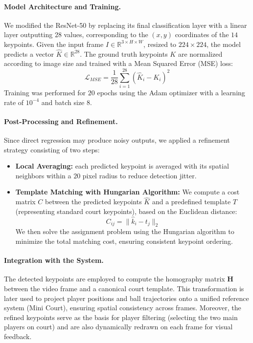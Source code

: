 \paragraph{Model Architecture and Training.}  
We modified the ResNet-50 by replacing its final classification layer with a linear layer outputting $28$ values, corresponding to the $(x,y)$ coordinates of the $14$ keypoints.  
Given the input frame $I \in \mathbb{R}^{3 \times H \times W}$, resized to $224 \times 224$, the model predicts a vector $\hat{K} \in \mathbb{R}^{28}$.  
The ground truth keypoints $K$ are normalized according to image size and trained with a Mean Squared Error (MSE) loss:
\[
\mathcal{L}_{MSE} = \frac{1}{28} \sum_{i=1}^{28} \left( \hat{K}_i - K_i \right)^2
\]
Training was performed for $20$ epochs using the Adam optimizer with a learning rate of $10^{-4}$ and batch size $8$.

\paragraph{Post-Processing and Refinement.}  
Since direct regression may produce noisy outputs, we applied a refinement strategy consisting of two steps:
\begin{itemize}
    \item \textbf{Local Averaging:} each predicted keypoint is averaged with its spatial neighbors within a $20$ pixel radius to reduce detection jitter.
    \item \textbf{Template Matching with Hungarian Algorithm:}  
    We compute a cost matrix $C$ between the predicted keypoints $\hat{K}$ and a predefined template $T$ (representing standard court keypoints), based on the Euclidean distance:
    \[
    C_{ij} = \| \hat{k}_i - t_j \|_2
    \]
    We then solve the assignment problem using the Hungarian algorithm to minimize the total matching cost, ensuring consistent keypoint ordering.
\end{itemize}

\paragraph{Integration with the System.}  
The detected keypoints are employed to compute the homography matrix $\mathbf{H}$ between the video frame and a canonical court template.
This transformation is later used to project player positions and ball trajectories onto a unified reference system (Mini Court), ensuring spatial consistency across frames.  
Moreover, the refined keypoints serve as the basis for player filtering (selecting the two main players on court) and are also dynamically redrawn on each frame for visual feedback.

